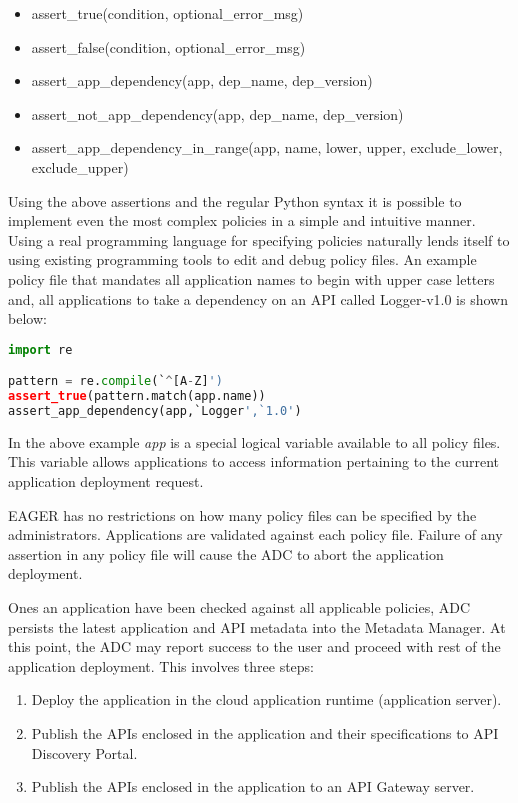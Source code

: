 \begin{itemize}
\item assert\_true(condition, optional\_error\_msg)
\item assert\_false(condition, optional\_error\_msg)
\item assert\_app\_dependency(app, dep\_name, dep\_version)
\item assert\_not\_app\_dependency(app, dep\_name, dep\_version)
\item assert\_app\_dependency\_in\_range(app, name, lower, upper, exclude\_lower, exclude\_upper)
\end{itemize}

Using the above assertions and the regular Python syntax it is possible to implement even the most complex policies in a simple and intuitive manner.
Using a real programming language for specifying policies naturally lends itself to using existing programming tools to edit and debug policy files. An example
policy file that mandates all application names to begin with upper case letters and, all applications to take a dependency on an API called Logger-v1.0
is shown below:

\begin{lstlisting}[language=Python, frame=single]
import re

pattern = re.compile(`^[A-Z]')
assert_true(pattern.match(app.name))
assert_app_dependency(app,`Logger',`1.0')
\end{lstlisting}

In the above example \textit{app} is a special logical variable available to all policy files. This variable allows applications to access information pertaining
to the current application deployment request. 

EAGER has no restrictions on how many policy files can be specified by the administrators. Applications are validated against each policy file. Failure of 
any assertion in any policy file will cause the ADC to abort the application deployment.

Ones an application have been checked against all applicable policies, ADC persists the latest application and API metadata into the Metadata Manager.
At this point, the ADC may report success to the user and proceed with rest of the application deployment. This involves three steps:

\begin{enumerate}
\item Deploy the application in the cloud application runtime (application server).
\item Publish the APIs enclosed in the application and their specifications to API Discovery Portal.
\item Publish the APIs enclosed in the application to an API Gateway server.
\end{enumerate}

